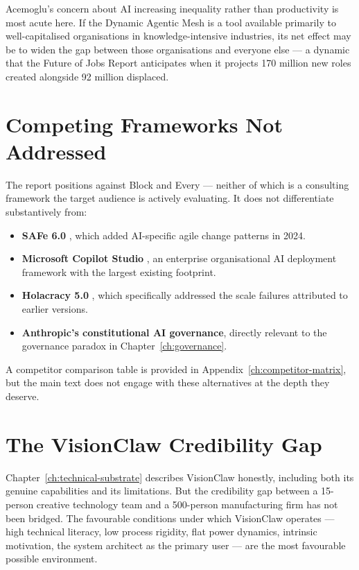 Acemoglu's concern about AI increasing inequality rather than productivity is most acute here. If the Dynamic Agentic Mesh is a tool available primarily to well-capitalised organisations in knowledge-intensive industries, its net effect may be to widen the gap between those organisations and everyone else --- a dynamic that the \textcite{WEF2025} Future of Jobs Report anticipates when it projects 170 million new roles created alongside 92 million displaced.

\section{Competing Frameworks Not Addressed}

The report positions against Block and Every --- neither of which is a consulting framework the target audience is actively evaluating. It does not differentiate substantively from:

\begin{itemize}
  \item \textbf{SAFe 6.0} \parencite{SAFe2024}, which added AI-specific agile change patterns in 2024.
  \item \textbf{Microsoft Copilot Studio} \parencite{MicrosoftCopilotStudio2025}, an enterprise organisational AI deployment framework with the largest existing footprint.
  \item \textbf{Holacracy 5.0} \parencite{Holacracy2024}, which specifically addressed the scale failures attributed to earlier versions.
  \item \textbf{Anthropic's constitutional AI governance}, directly relevant to the governance paradox in Chapter~\ref{ch:governance}.
\end{itemize}

A competitor comparison table is provided in Appendix~\ref{ch:competitor-matrix}, but the main text does not engage with these alternatives at the depth they deserve.

\section{The VisionClaw Credibility Gap}

Chapter~\ref{ch:technical-substrate} describes VisionClaw honestly, including both its genuine capabilities and its limitations. But the credibility gap between a 15-person creative technology team and a 500-person manufacturing firm has not been bridged. The favourable conditions under which VisionClaw operates --- high technical literacy, low process rigidity, flat power dynamics, intrinsic motivation, the system architect as the primary user --- are the most favourable possible environment.

